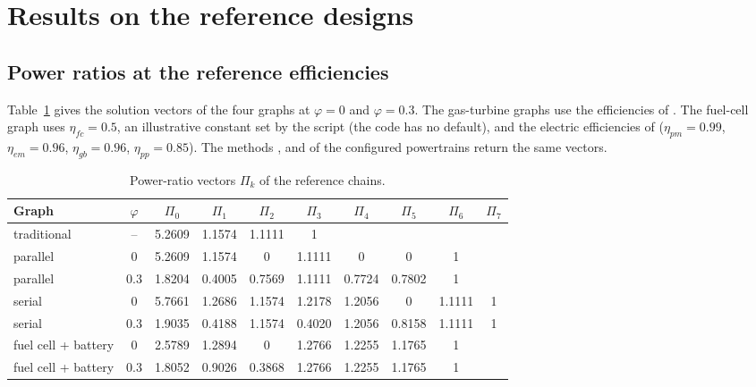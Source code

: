 \documentclass[a4paper,11pt]{article}
\begin{document}
\section{Results on the reference designs}\label{sec:results}

\subsection{Power ratios at the reference efficiencies}\label{sec:res-ratios}
Table~\ref{tab:ratios} gives the solution vectors of the four graphs at $\varphi = 0$ and
$\varphi = 0.3$. The gas-turbine graphs use the efficiencies of . The
fuel-cell graph uses $\eta_{fc} = 0.5$, an illustrative constant set by the script (the code
has no default), and the electric efficiencies
of  ($\eta_{pm} = 0.99$, $\eta_{em} = 0.96$,
$\eta_{gb} = 0.96$, $\eta_{pp} = 0.85$). The methods ,  and
 of the configured powertrains return the same vectors.

\begin{table}[htbp]
\centering\small
\caption{Power-ratio vectors $\Pi_k$ of the reference chains.}\label{tab:ratios}
\setlength{\tabcolsep}{4pt}
\begin{tabular}{@{}lccccccccc@{}}
\toprule
Graph & $\varphi$ & $\Pi_0$ & $\Pi_1$ & $\Pi_2$ & $\Pi_3$ & $\Pi_4$ & $\Pi_5$ & $\Pi_6$ & $\Pi_7$ \\
\midrule
traditional & -- & 5.2609 & 1.1574 & 1.1111 & 1 & & & & \\
parallel & 0 & 5.2609 & 1.1574 & 0 & 1.1111 & 0 & 0 & 1 & \\
parallel & 0.3 & 1.8204 & 0.4005 & 0.7569 & 1.1111 & 0.7724 & 0.7802 & 1 & \\
serial & 0 & 5.7661 & 1.2686 & 1.1574 & 1.2178 & 1.2056 & 0 & 1.1111 & 1 \\
serial & 0.3 & 1.9035 & 0.4188 & 1.1574 & 0.4020 & 1.2056 & 0.8158 & 1.1111 & 1 \\
fuel cell + battery & 0 & 2.5789 & 1.2894 & 0 & 1.2766 & 1.2255 & 1.1765 & 1 & \\
fuel cell + battery & 0.3 & 1.8052 & 0.9026 & 0.3868 & 1.2766 & 1.2255 & 1.1765 & 1 & \\
\bottomrule
\end{tabular}
\end{table}
\end{document}

